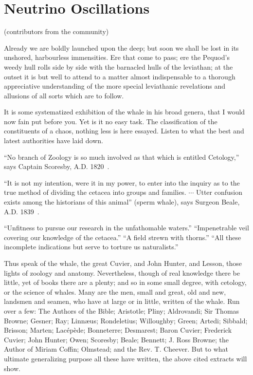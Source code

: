 
\setcounter{chapter}{0} 


\chapter{Neutrino Oscillations}

   {(contributors from the community)}


Already we are boldly launched upon the deep; but soon we shall be lost in its unshored, harbourless immensities. Ere that come to pass; ere the Pequod’s weedy hull rolls side by side with the barnacled hulls of the leviathan; at the outset it is but well to attend to a matter almost indispensable to a thorough appreciative understanding of the more special leviathanic revelations and allusions of all sorts which are to follow.

It is some systematized exhibition of the whale in his broad genera, that I would now fain put before you. Yet is it no easy task. The classification of the constituents of a chaos, nothing less is here essayed. Listen to what the best and latest authorities have laid down.

``No branch of Zoology is so much involved as that which is entitled Cetology,'' says Captain Scoresby, A.D. 1820~\cite{N1-Scoresby}.

``It is not my intention, were it in my power, to enter into the inquiry as to the true method of dividing the cetacea into groups and families. $\cdots$ Utter confusion exists among the historians of this animal'' (sperm whale), says Surgeon Beale, A.D. 1839~\cite{N1-Beale}.

``Unfitness to pursue our research in the unfathomable waters.'' ``Impenetrable veil covering our knowledge of the cetacea.''  ``A field strewn with thorns.'' ``All these incomplete indications but serve to torture us naturalists.''~\cite{N1-Cuvier,N1-Hunter,N1-Lesson}

Thus speak of the whale, the great Cuvier, and John Hunter, and Lesson, those lights of zoology and anatomy. Nevertheless, though of real knowledge there be little, yet of books there are a plenty; and so in some small degree, with cetology, or the science of whales. Many are the men, small and great, old and new, landsmen and seamen, who have at large or in little, written of the whale. Run over a few: The Authors of the Bible; Aristotle; Pliny; Aldrovandi; Sir Thomas Browne; Gesner; Ray; Linnæus; Rondeletius; Willoughby; Green; Artedi; Sibbald; Brisson; Marten; Lacépède; Bonneterre; Desmarest; Baron Cuvier; Frederick Cuvier; John Hunter; Owen; Scoresby; Beale; Bennett; J. Ross Browne; the Author of Miriam Coffin; Olmstead; and the Rev. T. Cheever. But to what ultimate generalizing purpose all these have written, the above cited extracts will show.

